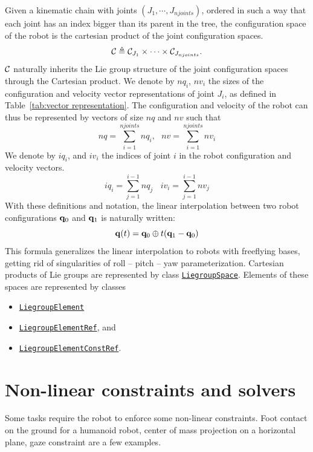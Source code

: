 Given a kinematic chain with joints $(J_1, \cdots, J_{njoints})$, ordered in such
a way that each joint has an index bigger than its parent in the tree, the configuration space of the robot is the cartesian product of the joint configuration spaces.
$$
\mathcal{C} \triangleq \mathcal{C}_{J_1}\times \cdots \times \mathcal{C}_{J_{njoints}}.
$$
$\mathcal{C}$ naturally inherits the Lie group structure of the joint configuration spaces through the Cartesian product.
We denote by $nq_i$, $nv_i$ the sizes of the configuration and velocity vector representations of joint $J_i$, as defined in Table~\ref{tab:vector representation}.
The configuration and velocity of the robot can thus be represented by vectors of size $nq$ and $nv$ such that
$$
nq = \sum_{i=1}^{njoints} nq_i, \ \ \ nv = \sum_{i=1}^{njoints} nv_i
$$
We denote by $iq_i$, and $iv_i$ the indices of joint $i$ in the robot configuration and velocity vectors.
$$
iq_i = \sum_{j=1}^{i-1} nq_j\ \ \ \ iv_i = \sum_{j=1}^{i-1} nv_j
$$
With these definitions and notation, the linear interpolation between two robot
configurations $\mathbf{q}_0$ and $\mathbf{q}_1$ is naturally written:
$$
\mathbf{q}(t) = \mathbf{q}_0 \oplus t (\mathbf{q}_1 - \mathbf{q}_0)
$$
This formula generalizes the linear interpolation to robots with freeflying bases, getting rid of singularities of roll -- pitch -- yaw parameterization.
Cartesian products of Lie groups are represented by class \href{https://gepettoweb.laas.fr/hpp/hpp-pinocchio/doxygen-html/classhpp_1_1pinocchio_1_1LiegroupSpace.html}{\texttt{LiegroupSpace}}. Elements of these spaces are represented by classes
\begin{itemize}
\item \href{https://gepettoweb.laas.fr/hpp/hpp-pinocchio/doxygen-html/classhpp_1_1pinocchio_1_1LiegroupElementBase.html}{\texttt{LiegroupElement}}
\item \href{https://gepettoweb.laas.fr/hpp/hpp-pinocchio/doxygen-html/classhpp_1_1pinocchio_1_1LiegroupElementBase.html}{\texttt{LiegroupElementRef}}, and
\item \href{https://gepettoweb.laas.fr/hpp/hpp-pinocchio/doxygen-html/classhpp_1_1pinocchio_1_1LiegroupElementBase.html}{\texttt{LiegroupElementConstRef}}.
  \end{itemize}

\section{Non-linear constraints and solvers}\label{sec:constraints}

Some tasks require the robot to enforce some non-linear constraints. Foot contact on the ground for a humanoid robot, center of mass projection on a horizontal plane, gaze constraint are a few examples.

